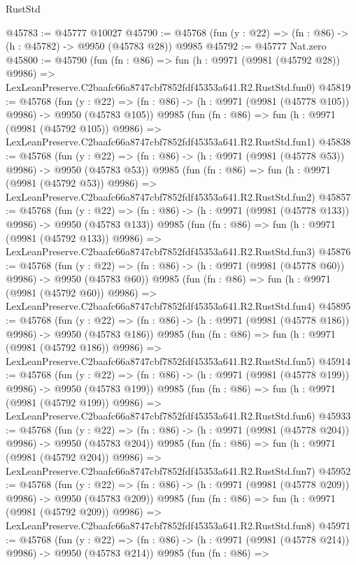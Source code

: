 \begin{lexlean}{RustStd}
\begin{coremodule}
@45783 := @45777 @10027
@45790 := @45768 (fun (y : @22) => (fn : @86) -> (h : @45782) -> @9950 (@45783 @28)) @9985
@45792 := @45777 Nat.zero
@45800 := @45790
    (fun (fn : @86) =>
    fun (h : @9971 (@9981 (@45792 @28)) @9986) =>
    LexLeanPreserve.C2baafc66a8747cbf7852fdf45353a641.R2.RustStd.fun0)
@45819 := @45768
    (fun (y : @22) => (fn : @86) -> (h : @9971 (@9981 (@45778 @105)) @9986) -> @9950 (@45783 @105))
    @9985
    (fun (fn : @86) =>
    fun (h : @9971 (@9981 (@45792 @105)) @9986) =>
    LexLeanPreserve.C2baafc66a8747cbf7852fdf45353a641.R2.RustStd.fun1)
@45838 := @45768
    (fun (y : @22) => (fn : @86) -> (h : @9971 (@9981 (@45778 @53)) @9986) -> @9950 (@45783 @53))
    @9985
    (fun (fn : @86) =>
    fun (h : @9971 (@9981 (@45792 @53)) @9986) =>
    LexLeanPreserve.C2baafc66a8747cbf7852fdf45353a641.R2.RustStd.fun2)
@45857 := @45768
    (fun (y : @22) => (fn : @86) -> (h : @9971 (@9981 (@45778 @133)) @9986) -> @9950 (@45783 @133))
    @9985
    (fun (fn : @86) =>
    fun (h : @9971 (@9981 (@45792 @133)) @9986) =>
    LexLeanPreserve.C2baafc66a8747cbf7852fdf45353a641.R2.RustStd.fun3)
@45876 := @45768
    (fun (y : @22) => (fn : @86) -> (h : @9971 (@9981 (@45778 @60)) @9986) -> @9950 (@45783 @60))
    @9985
    (fun (fn : @86) =>
    fun (h : @9971 (@9981 (@45792 @60)) @9986) =>
    LexLeanPreserve.C2baafc66a8747cbf7852fdf45353a641.R2.RustStd.fun4)
@45895 := @45768
    (fun (y : @22) => (fn : @86) -> (h : @9971 (@9981 (@45778 @186)) @9986) -> @9950 (@45783 @186))
    @9985
    (fun (fn : @86) =>
    fun (h : @9971 (@9981 (@45792 @186)) @9986) =>
    LexLeanPreserve.C2baafc66a8747cbf7852fdf45353a641.R2.RustStd.fun5)
@45914 := @45768
    (fun (y : @22) => (fn : @86) -> (h : @9971 (@9981 (@45778 @199)) @9986) -> @9950 (@45783 @199))
    @9985
    (fun (fn : @86) =>
    fun (h : @9971 (@9981 (@45792 @199)) @9986) =>
    LexLeanPreserve.C2baafc66a8747cbf7852fdf45353a641.R2.RustStd.fun6)
@45933 := @45768
    (fun (y : @22) => (fn : @86) -> (h : @9971 (@9981 (@45778 @204)) @9986) -> @9950 (@45783 @204))
    @9985
    (fun (fn : @86) =>
    fun (h : @9971 (@9981 (@45792 @204)) @9986) =>
    LexLeanPreserve.C2baafc66a8747cbf7852fdf45353a641.R2.RustStd.fun7)
@45952 := @45768
    (fun (y : @22) => (fn : @86) -> (h : @9971 (@9981 (@45778 @209)) @9986) -> @9950 (@45783 @209))
    @9985
    (fun (fn : @86) =>
    fun (h : @9971 (@9981 (@45792 @209)) @9986) =>
    LexLeanPreserve.C2baafc66a8747cbf7852fdf45353a641.R2.RustStd.fun8)
@45971 := @45768
    (fun (y : @22) => (fn : @86) -> (h : @9971 (@9981 (@45778 @214)) @9986) -> @9950 (@45783 @214))
    @9985
    (fun (fn : @86) =>

\end{coremodule}
\end{lexlean}
